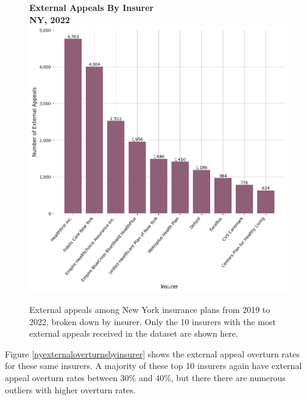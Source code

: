 \documentclass[12pt, a4paper,twoside,parskip=full]{report}
\theoremstyle{plain} %
\theoremstyle{definition} %
\theoremstyle{remark} %
\numberwithin{equation}{chapter}
\begin{document}
		
		\begin{figure}[h!]
			\centering
			\textbf{External Appeals By Insurer}\\
			\textbf{NY, 2022}\\
			\includegraphics[width=.8\textwidth]{images/nys_external/external_appeals_top_insurers.png}
			\caption{External appeals among New York insurance plans from 2019 to 2022, broken down by insurer. Only the 10 insurers with the most external appeals received in the dataset are shown here.}
			\label{nyexternalbyinsurer}
		\end{figure}
		\clearpage
		
		Figure \ref{nyexternaloverturnsbyinsurer} shows the external appeal overturn rates for these same insurers. A majority of these top 10 insurers again have external appeal overturn rates between 30\% and 40\%, but there there are numerous outliers with higher overturn rates.
		
\end{document}

